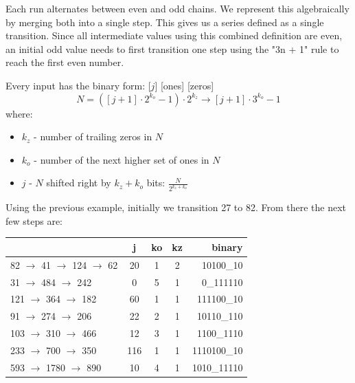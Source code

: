 \documentclass[letterpaper]{article}
\begin{document}
\begin{multicols}{2}
    Each run alternates between even and odd chains. We represent this algebraically by merging both into a single step. This gives us a series defined as a single transition. Since all intermediate values using this combined definition are even, an initial odd value needs to first transition one step using the "3n + 1" rule to reach the first even number.

    Every input has the binary form: [$j$] [ones] [zeros]
    \[
        N = ([j + 1] \cdot 2^{k_o} - 1) \cdot 2^{k_z} \rightarrow [j + 1] \cdot 3^{k_o} - 1
    \]
    where:
    \begin{itemize}
        \item $k_z$ - number of trailing zeros in $N$
        \item $k_o$ - number of the next higher set of ones in $N$
        \item $j$ - $N$ shifted right by $k_z + k_o$ bits: $\frac{N}{2^{k_z + k_o}}$
    \end{itemize}

    Using the previous example, initially we transition 27 to 82. From there the next few steps are:

    \noindent
    \begin{minipage}{\columnwidth}
        \setlength{\tabcolsep}{.35\tabcolsep}
        \centering
        \begin{tabular}{|l|c|c|c|r|}
            \hline
                                             & \textbf{j} & \textbf{ko} & \textbf{kz} & \textbf{binary} \\
            \hline
            82 $\to$ 41  $\to$  124 $\to$ 62 & 20         & 1           & 2           & 10100\_10       \\
            \hline
            31  $\to$  484 $\to$ 242   & 0          & 5           & 1           & 0\_111110       \\
            \hline
            121 $\to$  364 $\to$ 182   & 60         & 1           & 1           & 111100\_10      \\
            \hline
            91 $\to$  274 $\to$ 206   & 22         & 2           & 1           & 10110\_110      \\
            \hline
            103 $\to$  310 $\to$ 466   & 12         & 3           & 1           & 1100\_1110      \\
            \hline
            233 $\to$  700 $\to$ 350   & 116        & 1           & 1           & 1110100\_10     \\
            \hline
            593 $\to$ 1780 $\to$ 890   & 10         & 4           & 1           & 1010\_11110     \\
            \hline
        \end{tabular}
    \end{minipage}


\end{multicols}
\end{document}
